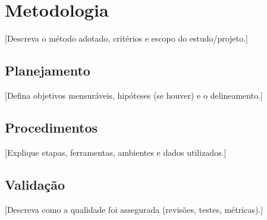 \section{Metodologia}

[Descreva o método adotado, critérios e escopo do estudo/projeto.]

\subsection{Planejamento}
[Defina objetivos mensuráveis, hipóteses (se houver) e o delineamento.]

\subsection{Procedimentos}
[Explique etapas, ferramentas, ambientes e dados utilizados.]

\subsection{Validação}
[Descreva como a qualidade foi assegurada (revisões, testes, métricas).]
